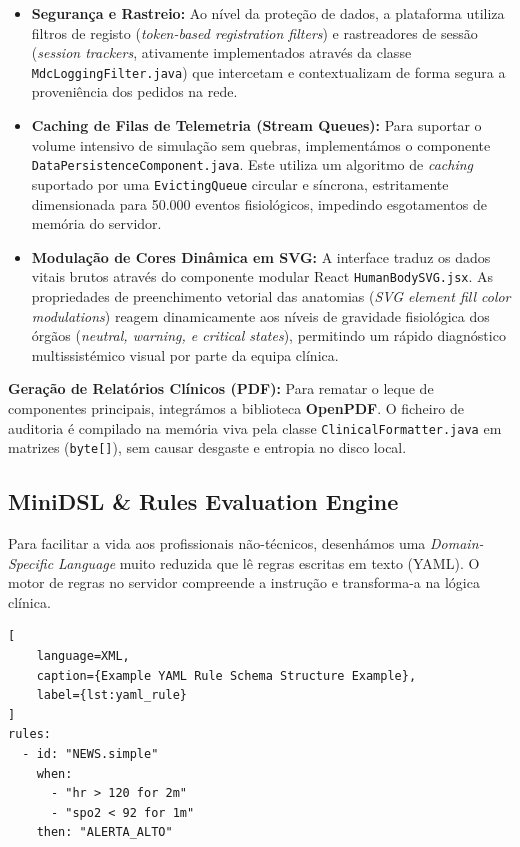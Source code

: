 \documentclass[11pt,a4paper]{article}
\begin{document}
\begin{itemize}[label=\color{accentblue}$\bullet$]
    \item \textbf{Segurança e Rastreio:} Ao nível da proteção de dados, a plataforma utiliza filtros de registo (\textit{token-based registration filters}) e rastreadores de sessão (\textit{session trackers}, ativamente implementados através da classe \texttt{MdcLoggingFilter.java}) que intercetam e contextualizam de forma segura a proveniência dos pedidos na rede.
    \item \textbf{Caching de Filas de Telemetria (Stream Queues):} Para suportar o volume intensivo de simulação sem quebras, implementámos o componente \texttt{DataPersistenceComponent.java}. Este utiliza um algoritmo de \textit{caching} suportado por uma \texttt{EvictingQueue} circular e síncrona, estritamente dimensionada para 50.000 eventos fisiológicos, impedindo esgotamentos de memória do servidor.
    \item \textbf{Modulação de Cores Dinâmica em SVG:} A interface traduz os dados vitais brutos através do componente modular React \texttt{HumanBodySVG.jsx}. As propriedades de preenchimento vetorial das anatomias (\textit{SVG element fill color modulations}) reagem dinamicamente aos níveis de gravidade fisiológica dos órgãos (\textit{neutral, warning, e critical states}), permitindo um rápido diagnóstico multissistémico visual por parte da equipa clínica.
\end{itemize}

\textbf{Geração de Relatórios Clínicos (PDF):} Para rematar o leque de componentes principais, integrámos a biblioteca \textbf{OpenPDF}. O ficheiro de auditoria é compilado na memória viva pela classe \texttt{ClinicalFormatter.java} em matrizes (\texttt{byte[]}), sem causar desgaste e entropia no disco local.

\subsection{MiniDSL \& Rules Evaluation Engine}
Para facilitar a vida aos profissionais não-técnicos, desenhámos uma \textit{Domain-Specific Language} muito reduzida que lê regras escritas em texto (YAML). O motor de regras no servidor compreende a instrução e transforma-a na lógica clínica.

\begin{lstlisting}[
    language=XML,
    caption={Example YAML Rule Schema Structure Example}, 
    label={lst:yaml_rule}
]
rules:
  - id: "NEWS.simple"
    when:
      - "hr > 120 for 2m"
      - "spo2 < 92 for 1m"
    then: "ALERTA_ALTO"
\end{lstlisting}
\end{document}
